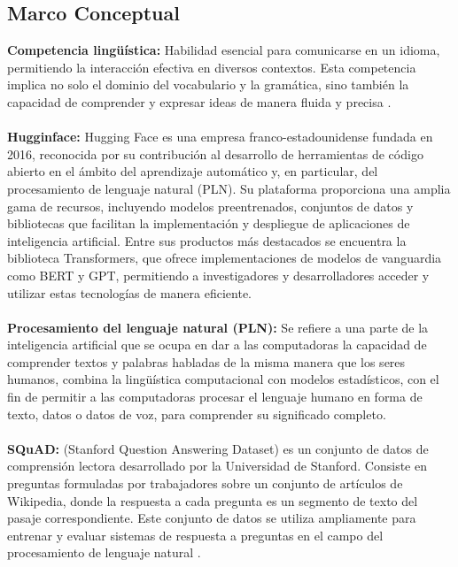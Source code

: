 \subsection{Marco Conceptual}

\textbf{Competencia lingüística: }Habilidad esencial para comunicarse en un idioma, permitiendo la interacción efectiva en diversos contextos. Esta competencia implica no solo el dominio del vocabulario y la gramática, sino también la capacidad de comprender y expresar ideas de manera fluida y precisa \cite{martinez2020herramientas}.
\\
\\
\textbf{Hugginface: }
Hugging Face \cite{Jain2022} es una empresa franco-estadounidense fundada en 2016, reconocida por su contribución al desarrollo de herramientas de código abierto en el ámbito del aprendizaje automático y, en particular, del procesamiento de lenguaje natural (PLN). Su plataforma proporciona una amplia gama de recursos, incluyendo modelos preentrenados, conjuntos de datos y bibliotecas que facilitan la implementación y despliegue de aplicaciones de inteligencia artificial. Entre sus productos más destacados se encuentra la biblioteca Transformers, que ofrece implementaciones de modelos de vanguardia como BERT y GPT, permitiendo a investigadores y desarrolladores acceder y utilizar estas tecnologías de manera eficiente.
\\
\\
\textbf{Procesamiento del lenguaje natural (PLN): } Se refiere a una parte de la inteligencia artificial que se ocupa en dar a las computadoras la capacidad de comprender textos y palabras habladas de la misma manera que los seres humanos, combina la lingüística computacional con modelos estadísticos, con el fin de permitir a las computadoras procesar el lenguaje humano \cite{ibm_pln} en forma de texto, datos o datos de voz, para comprender su significado completo.
\\
\\
\textbf{SQuAD: } (Stanford Question Answering Dataset) es un conjunto de datos de comprensión lectora desarrollado por la Universidad de Stanford. Consiste en preguntas formuladas por trabajadores sobre un conjunto de artículos de Wikipedia, donde la respuesta a cada pregunta es un segmento de texto del pasaje correspondiente. Este conjunto de datos se utiliza ampliamente para entrenar y evaluar sistemas de respuesta a preguntas en el campo del procesamiento de lenguaje natural \cite{Rajpurkar2016}.
\\
\\
